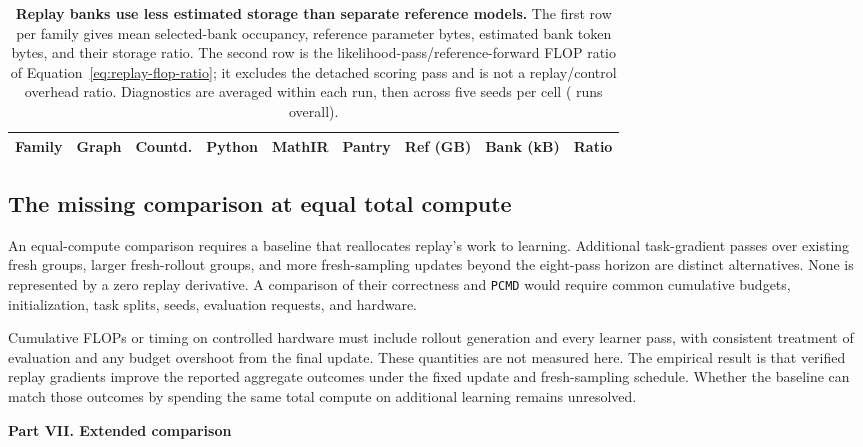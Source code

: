 \documentclass{article}
\newcommand{\1}{\mathbf 1}
\newcommand{\pmd}{\texttt{PCMD}}
\theoremstyle{remark}
\theoremstyle{definition}
\theoremstyle{plain}
\begin{document}
\begin{table}[t]
  \centering
  \caption{\textbf{Replay banks use less estimated storage than separate reference models.}
  The first row per family gives mean selected-bank occupancy, reference
  parameter bytes, estimated bank token bytes, and their storage ratio. The
  second row is the likelihood-pass/reference-forward FLOP ratio of
  Equation~\eqref{eq:replay-flop-ratio}; it excludes the detached scoring pass
  and is not a replay/control overhead ratio. Diagnostics are averaged within
  each run, then across five seeds per cell (\MDcostRuns{} runs overall).}
  \label{tab:replay-cost}
  \scriptsize
  \setlength{\tabcolsep}{4.2pt}
  \begin{tabular}{@{}lrrrrrrrr@{}}
    \toprule
    \textbf{Family} & \textbf{Graph} & \textbf{Countd.} & \textbf{Python}
      & \textbf{MathIR} & \textbf{Pantry} & \textbf{Ref (GB)}
      & \textbf{Bank (kB)} & \textbf{Ratio} \\
    \midrule
    
  \end{tabular}
\end{table}

\subsection{The missing comparison at equal total compute}
\label{app:compute-budget-control}

An equal-compute comparison requires a baseline that reallocates replay's
work to learning. Additional task-gradient passes over existing fresh groups,
larger fresh-rollout groups, and more fresh-sampling updates beyond the
eight-pass horizon are distinct alternatives. None is represented by a
zero replay derivative. A comparison of their correctness and \pmd{} would
require common cumulative budgets, initialization, task splits, seeds,
evaluation requests, and hardware.

Cumulative FLOPs or timing on controlled hardware must include rollout
generation and every learner pass, with consistent treatment of evaluation
and any budget overshoot from the final update. These quantities are not
measured here. The empirical result is that verified replay gradients improve
the reported aggregate outcomes under the fixed update and fresh-sampling
schedule. Whether the baseline can match those outcomes by spending the
same total compute on additional learning remains unresolved.

\clearpage
{}
\begin{center}\large\textbf{Part VII. Extended comparison}\end{center}
\end{document}
